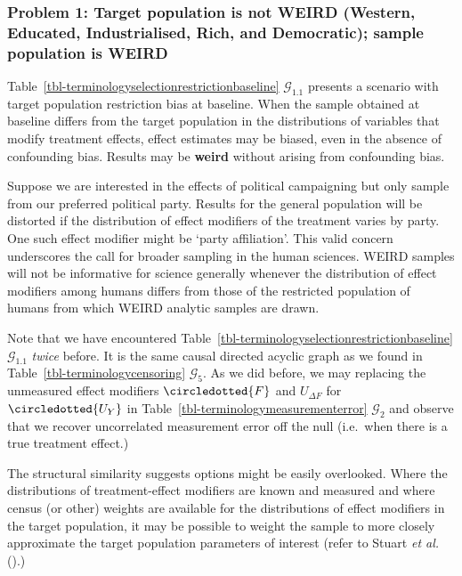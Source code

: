 \documentclass[
  single column]{article}
\begin{document}
\subsubsection{Problem 1: Target population is not WEIRD (Western,
Educated, Industrialised, Rich, and Democratic); sample population is
WEIRD}\label{problem-1-target-population-is-not-weird-western-educated-industrialised-rich-and-democratic-sample-population-is-weird}

Table~\ref{tbl-terminologyselectionrestrictionbaseline}
\(\mathcal{G}_{1.1}\) presents a scenario with target population
restriction bias at baseline. When the sample obtained at baseline
differs from the target population in the distributions of variables
that modify treatment effects, effect estimates may be biased, even in
the absence of confounding bias. Results may be \textbf{weird} without
arising from confounding bias.

Suppose we are interested in the effects of political campaigning but
only sample from our preferred political party. Results for the general
population will be distorted if the distribution of effect modifiers of
the treatment varies by party. One such effect modifier might be `party
affiliation'. This valid concern underscores the call for broader
sampling in the human sciences. WEIRD samples will not be informative
for science generally whenever the distribution of effect modifiers
among humans differs from those of the restricted population of humans
from which WEIRD analytic samples are drawn.

Note that we have encountered
Table~\ref{tbl-terminologyselectionrestrictionbaseline}
\(\mathcal{G}_{1.1}\) \emph{twice} before. It is the same causal
directed acyclic graph as we found in
Table~\ref{tbl-terminologycensoring} \(\mathcal{G}_5\). As we did
before, we may replacing the unmeasured effect modifiers
\(\circledotted{F}\) and \(U_{\Delta F}\) for \(\circledotted{U_Y}\) in
Table~\ref{tbl-terminologymeasurementerror} \(\mathcal{G}_2\) and
observe that we recover uncorrelated measurement error off the null
(i.e.~when there is a true treatment effect.)

The structural similarity suggests options might be easily overlooked.
Where the distributions of treatment-effect modifiers are known and
measured and where census (or other) weights are available for the
distributions of effect modifiers in the target population, it may be
possible to weight the sample to more closely approximate the target
population parameters of interest (refer to Stuart \emph{et al.}
().)
\end{document}
